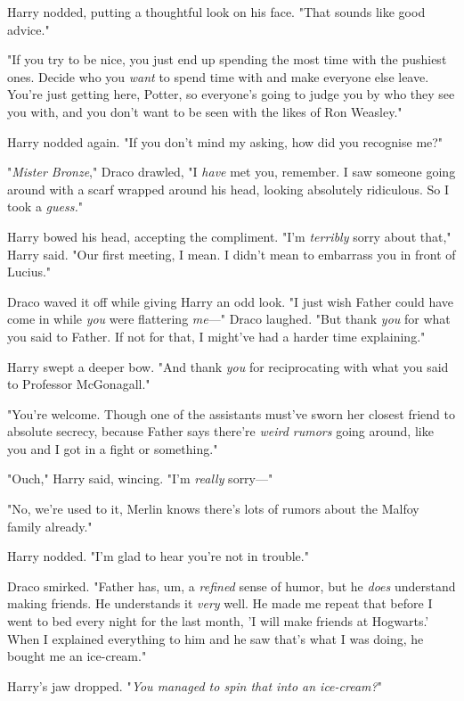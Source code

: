 Harry nodded, putting a thoughtful look on his face. "That sounds like good 
advice."

"If you try to be nice, you just end up spending the most time with the 
pushiest ones. Decide who you \emph{want} to spend time with and make everyone 
else leave. You're just getting here, Potter, so everyone's going to judge you 
by who they see you with, and you don't want to be seen with the likes of Ron 
Weasley."

Harry nodded again. "If you don't mind my asking, how did you recognise me?"

"\emph{Mister Bronze}," Draco drawled, "I \emph{have} met you, remember. I saw 
someone going around with a scarf wrapped around his head, looking absolutely 
ridiculous. So I took a \emph{guess.}"

Harry bowed his head, accepting the compliment. "I'm \emph{terribly} sorry 
about that," Harry said. "Our first meeting, I mean. I didn't mean to embarrass 
you in front of Lucius."

Draco waved it off while giving Harry an odd look. "I just wish Father could 
have come in while \emph{you} were flattering \emph{me}---" Draco laughed. "But 
thank \emph{you} for what you said to Father. If not for that, I might've had a 
harder time explaining."

Harry swept a deeper bow. "And thank \emph{you} for reciprocating with what you 
said to Professor McGonagall."

"You're welcome. Though one of the assistants must've sworn her closest friend 
to absolute secrecy, because Father says there're \emph{weird rumors} going 
around, like you and I got in a fight or something."

"Ouch," Harry said, wincing. "I'm \emph{really} sorry---"

"No, we're used to it, Merlin knows there's lots of rumors about the Malfoy 
family already."

Harry nodded. "I'm glad to hear you're not in trouble."

Draco smirked. "Father has, um, a \emph{refined} sense of humor, but he 
\emph{does} understand making friends. He understands it \emph{very} well. He 
made me repeat that before I went to bed every night for the last month, 'I 
will make friends at Hogwarts.' When I explained everything to him and he saw 
that's what I was doing, he bought me an ice-cream."

Harry's jaw dropped. "\emph{You managed to spin that into an ice-cream?}"

